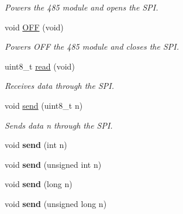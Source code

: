 \begin{DoxyCompactItemize}
\begin{DoxyCompactList}\small\item\em Powers the 485 module and opens the S\+PI. \end{DoxyCompactList}\item 
void \hyperlink{class_wasp485_a51e9d26ea08d94cf36f06408e41163fe}{O\+FF} (void)\hypertarget{class_wasp485_a51e9d26ea08d94cf36f06408e41163fe}{}\label{class_wasp485_a51e9d26ea08d94cf36f06408e41163fe}

\begin{DoxyCompactList}\small\item\em Powers O\+FF the 485 module and closes the S\+PI. \end{DoxyCompactList}\item 
uint8\+\_\+t \hyperlink{class_wasp485_afee02c12cacaf55535ebf83f8e3de9e6}{read} (void)\hypertarget{class_wasp485_afee02c12cacaf55535ebf83f8e3de9e6}{}\label{class_wasp485_afee02c12cacaf55535ebf83f8e3de9e6}

\begin{DoxyCompactList}\small\item\em Receives data through the S\+PI. \end{DoxyCompactList}\item 
void \hyperlink{class_wasp485_a76990fc0c2b599cdf7e3acec6233f18d}{send} (uint8\+\_\+t n)\hypertarget{class_wasp485_a76990fc0c2b599cdf7e3acec6233f18d}{}\label{class_wasp485_a76990fc0c2b599cdf7e3acec6233f18d}

\begin{DoxyCompactList}\small\item\em Sends data n through the S\+PI. \end{DoxyCompactList}\item 
void {\bfseries send} (int n)\hypertarget{class_wasp485_a5468d13f7c3c7fa6f3aa3a83648db927}{}\label{class_wasp485_a5468d13f7c3c7fa6f3aa3a83648db927}

\item 
void {\bfseries send} (unsigned int n)\hypertarget{class_wasp485_a25dc05af4655f1df29ed1a6e060c00a9}{}\label{class_wasp485_a25dc05af4655f1df29ed1a6e060c00a9}

\item 
void {\bfseries send} (long n)\hypertarget{class_wasp485_ace8b0f2a3f61fb477247e5f987357d9e}{}\label{class_wasp485_ace8b0f2a3f61fb477247e5f987357d9e}

\item 
void {\bfseries send} (unsigned long n)\hypertarget{class_wasp485_a97299dd437626e47f1f11793f9b495f8}{}\label{class_wasp485_a97299dd437626e47f1f11793f9b495f8}


\end{DoxyCompactItemize}
